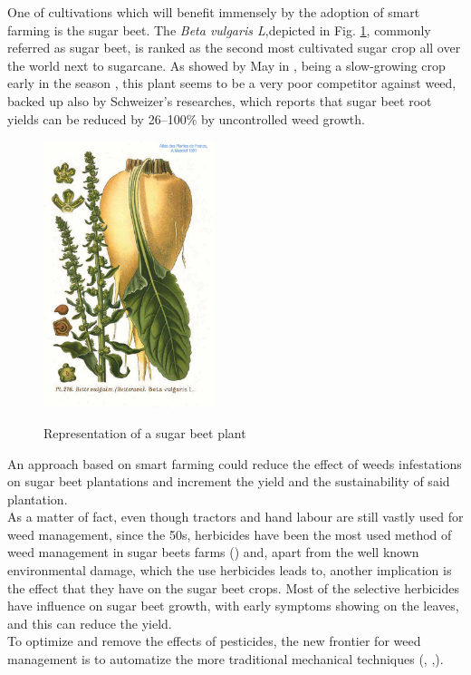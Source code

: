 One of cultivations which will benefit immensely by the adoption of smart farming is the sugar beet. The \textit{Beta vulgaris L},depicted in Fig. \ref{fig:sugar_beet}, commonly referred as sugar beet, is ranked as the second most cultivated  sugar crop all over the world next to sugarcane\cite{bhadra_weed_2020}. As showed by May in \cite{may_economic_2003}, being a slow-growing crop early in the season \cite{bhadra_weed_2020}, this plant seems to be a very poor competitor against weed, backed up also by Schweizer's researches, which reports that sugar beet root yields can be reduced by 26–100\% by uncontrolled weed growth.  \cite{schweizer_weed_1989}\\
\begin{figure}[ht]
	\centering
	\includegraphics[width = 5cm]{img/276_Beta_vulgaris_L.jpg}
	\caption[Representation of a sugar beet plant]{Representation of a sugar beet plant \cite{masclef_sugar_1891} }{\centering}
	\label{fig:sugar_beet}
\end{figure}
An approach based on smart farming could reduce the effect of weeds infestations on sugar beet plantations and  increment the yield and the sustainability of said plantation.\\
As a matter of fact, even though tractors and hand labour are still vastly used for weed management, since the 50s, herbicides have been the most used method of weed management in sugar beets farms (\cite{cioni_weed_2010}) and, apart from the well known environmental damage, which the use herbicides leads to, another implication is the effect that they have on the sugar beet crops. Most of the selective herbicides have influence on sugar beet growth, with early symptoms showing on the leaves, and this can reduce the yield. \cite{petersen_review_2004}\\
To optimize and remove the effects of pesticides, the new frontier for weed management is to automatize the more traditional mechanical techniques (\cite{raja_real-time_2020}, \cite{frasconi_design_2014},\cite{machleb_sensor-based_2021}).\\
